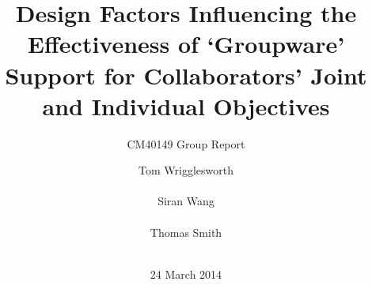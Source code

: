 \documentclass{acm_proc_article-sp}
\begin{document}
\title{Design Factors Influencing the Effectiveness of `Groupware' Support for Collaborators' Joint and Individual Objectives}
\subtitle{CM40149 Group Report}
%
%
%
%
%

%
\author{
%
%
\alignauthor
Tom Wrigglesworth\\
       \\
\alignauthor
Siran Wang\\
       \\
\alignauthor Thomas Smith\\
       \\
}
\date{24 March 2014}
\end{document}
